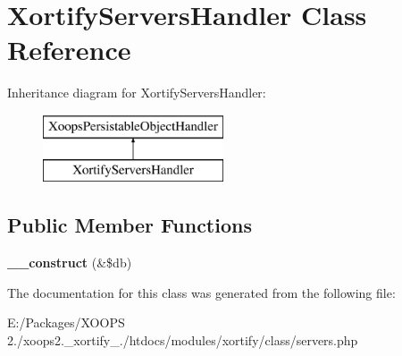 \hypertarget{class_xortify_servers_handler}{\section{Xortify\-Servers\-Handler Class Reference}
\label{class_xortify_servers_handler}
}
Inheritance diagram for Xortify\-Servers\-Handler\-:\begin{figure}[H]
\begin{center}
\leavevmode
\includegraphics[height=2.000000cm]{class_xortify_servers_handler}
\end{center}
\end{figure}
\subsection*{Public Member Functions}
\begin{DoxyCompactItemize}
\item 
\hypertarget{class_xortify_servers_handler_af25e58851525e81f176fabbfda8acd4e}{{\bfseries \-\_\-\-\_\-construct} (\&\$db)}\label{class_xortify_servers_handler_af25e58851525e81f176fabbfda8acd4e}

\end{DoxyCompactItemize}


The documentation for this class was generated from the following file\-:\begin{DoxyCompactItemize}
\item 
E\-:/\-Packages/\-X\-O\-O\-P\-S 2./xoops2.\-\_\-xortify\-\_./htdocs/modules/xortify/class/servers.\-php\end{DoxyCompactItemize}
